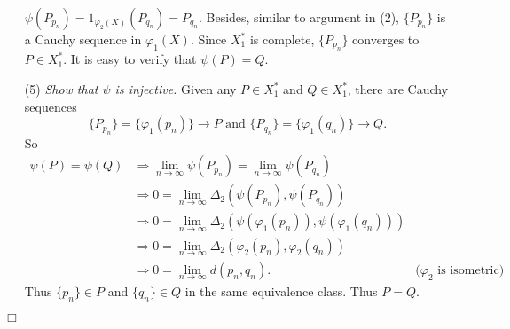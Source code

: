 \documentclass{article}
\begin{document}
\begin{enumerate}
  $\psi(P_{p_n}) = 1_{\varphi_2(X)}(P_{q_n}) = P_{q_n}$.
  Besides, similar to argument in (2),
  $\{P_{p_n}\}$ is a Cauchy sequence in $\varphi_1(X)$.
  Since $X^*_1$ is complete, $\{P_{p_n}\}$ converges to $P \in X^*_1$.
  It is easy to verify that $\psi(P) = Q$.
  \item[(5)]
  \emph{Show that $\psi$ is injective.}
  Given any $P \in X^*_1$ and $Q \in X^*_1$,
  there are Cauchy sequences
  $$\{P_{p_n}\} = \{\varphi_1(p_n)\} \to P \text{ and }
  \{P_{q_n}\} = \{\varphi_1(q_n)\} \to Q.$$
  So
  \begin{align*}
     \psi(P) = \psi(Q)
     &\Longrightarrow
     \lim_{n \to \infty} \psi(P_{p_n}) = \lim_{n \to \infty} \psi(P_{q_n}) \\
     &\Longrightarrow
     0 = \lim_{n \to \infty} \Delta_2(\psi(P_{p_n}),\psi(P_{q_n})) \\
     &\Longrightarrow
     0 = \lim_{n \to \infty} \Delta_2(\psi(\varphi_1(p_n)),\psi(\varphi_1(q_n))) \\
     &\Longrightarrow
     0 = \lim_{n \to \infty} \Delta_2(\varphi_2(p_n),\varphi_2(q_n)) \\
     &\Longrightarrow
     0 = \lim_{n \to \infty} d(p_n,q_n).
       &\text{($\varphi_2$ is isometric)}
  \end{align*}
  Thus $\{p_n\} \in P$ and $\{q_n\} \in Q$ in the same equivalence class.
  Thus $P = Q$.
\end{enumerate}
$\Box$ \\\\



\end{document}
